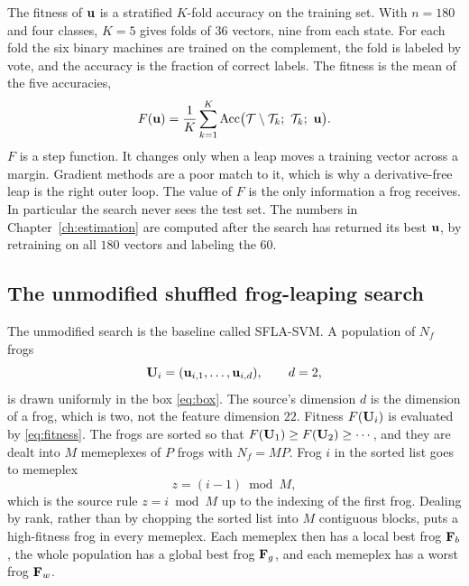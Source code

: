 The fitness of \(\mathbf{u}\) is a stratified \(K\)-fold accuracy on the training set.
With \(n=180\) and four classes, \(K=5\) gives folds of \(36\) vectors, nine from each state.
For each fold the six binary machines are trained on the complement, the fold is labeled by vote, and the accuracy is the fraction of correct labels.
The fitness is the mean of the five accuracies,
\begin{equation}
F(\vect{u})=\frac{1}{K}\sum_{k=1}^{K}\mathrm{Acc}\bigl(\mathcal{T}\setminus\mathcal{T}_{k};\ \mathcal{T}_{k};\ \vect{u}\bigr).
\label{eq:fitness}
\end{equation}
\(F\) is a step function.
It changes only when a leap moves a training vector across a margin.
Gradient methods are a poor match to it, which is why a derivative-free leap is the right outer loop.
The value of \(F\) is the only information a frog receives.
In particular the search never sees the test set.
The numbers in Chapter~\ref{ch:estimation} are computed after the search has returned its best \(\mathbf{u}\), by retraining on all \(180\) vectors and labeling the \(60\).

\subsection{The unmodified shuffled frog-leaping search}

The unmodified search is the baseline called SFLA-SVM.
A population of \(N_{f}\) frogs
\begin{equation}
\mathbf{U}_{i}=(\mathbf{u}_{i,1}, \ldots, \mathbf{u}_{i,d}),\qquad d=2,
\label{eq:frogs}
\end{equation}
is drawn uniformly in the box \eqref{eq:box}.
The source's dimension \(d\) is the dimension of a frog, which is two, not the feature dimension \(22\).
Fitness \(F(\mathbf{U}_{i})\) is evaluated by \eqref{eq:fitness}.
The frogs are sorted so that \(F(\mathbf{U}_{1})\ge F(\mathbf{U}_{2})\ge\cdots\), and they are dealt into \(M\) memeplexes of \(P\) frogs with \(N_{f}=M P\).
Frog \(i\) in the sorted list goes to memeplex
\begin{equation}
z=(i-1)\bmod M,
\label{eq:deal}
\end{equation}
which is the source rule \(z=i\bmod M\) up to the indexing of the first frog.
Dealing by rank, rather than by chopping the sorted list into \(M\) contiguous blocks, puts a high-fitness frog in every memeplex.
Each memeplex then has a local best frog \(\mathbf{F}_{b}\), the whole population has a global best frog \(\mathbf{F}_{g}\), and each memeplex has a worst frog \(\mathbf{F}_{w}\).


